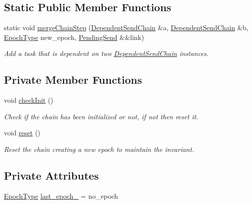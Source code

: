 \subsection*{Static Public Member Functions}
\begin{DoxyCompactItemize}
\item 
static void \hyperlink{classvt_1_1messaging_1_1_dependent_send_chain_a88c235288669210ba02b33185df1005d}{merge\+Chain\+Step} (\hyperlink{classvt_1_1messaging_1_1_dependent_send_chain}{Dependent\+Send\+Chain} \&a, \hyperlink{classvt_1_1messaging_1_1_dependent_send_chain}{Dependent\+Send\+Chain} \&b, \hyperlink{namespacevt_a985a5adf291c34a3ca263b3378388236}{Epoch\+Type} new\+\_\+epoch, \hyperlink{structvt_1_1messaging_1_1_pending_send}{Pending\+Send} \&\&link)
\begin{DoxyCompactList}\small\item\em Add a task that is dependent on two \hyperlink{classvt_1_1messaging_1_1_dependent_send_chain}{Dependent\+Send\+Chain} instances. \end{DoxyCompactList}\end{DoxyCompactItemize}
\subsection*{Private Member Functions}
\begin{DoxyCompactItemize}
\item 
void \hyperlink{classvt_1_1messaging_1_1_dependent_send_chain_a2ebf8a8d7c1cc95afe97ea6f717258c7}{check\+Init} ()
\begin{DoxyCompactList}\small\item\em Check if the chain has been initialized or not, if not then reset it. \end{DoxyCompactList}\item 
void \hyperlink{classvt_1_1messaging_1_1_dependent_send_chain_aa5cf0fcb78d89b1491b154c820eb9ec6}{reset} ()
\begin{DoxyCompactList}\small\item\em Reset the chain creating a new epoch to maintain the invariant. \end{DoxyCompactList}\end{DoxyCompactItemize}
\subsection*{Private Attributes}
\begin{DoxyCompactItemize}
\item 
\hyperlink{namespacevt_a985a5adf291c34a3ca263b3378388236}{Epoch\+Type} \hyperlink{classvt_1_1messaging_1_1_dependent_send_chain_acbba3599015aff00654f3cb8efaba623}{last\+\_\+epoch\+\_\+} = no\+\_\+epoch
\end{DoxyCompactItemize}


